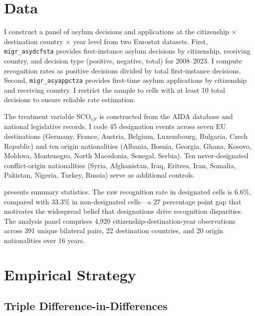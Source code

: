 \documentclass[12pt]{article}
\begin{document}
\section{Data}

I construct a panel of asylum decisions and applications at the citizenship $\times$ destination country $\times$ year level from two Eurostat datasets. First, \texttt{migr\_asydcfsta} provides first-instance asylum decisions by citizenship, receiving country, and decision type (positive, negative, total) for 2008--2023. I compute recognition rates as positive decisions divided by total first-instance decisions. Second, \texttt{migr\_asyappctza} provides first-time asylum applications by citizenship and receiving country. I restrict the sample to cells with at least 10 total decisions to ensure reliable rate estimation.

The treatment variable $\text{SCO}_{cjt}$ is constructed from the AIDA database \citep{aida2023country} and national legislative records. I code 45 designation events across seven EU destinations (Germany, France, Austria, Belgium, Luxembourg, Bulgaria, Czech Republic) and ten origin nationalities (Albania, Bosnia, Georgia, Ghana, Kosovo, Moldova, Montenegro, North Macedonia, Senegal, Serbia). Ten never-designated conflict-origin nationalities (Syria, Afghanistan, Iraq, Eritrea, Iran, Somalia, Pakistan, Nigeria, Turkey, Russia) serve as additional controls.

 presents summary statistics. The raw recognition rate in designated cells is 6.6\%, compared with 33.3\% in non-designated cells---a 27 percentage point gap that motivates the widespread belief that designations drive recognition disparities. The analysis panel comprises 4,920 citizenship-destination-year observations across 391 unique bilateral pairs, 22 destination countries, and 20 origin nationalities over 16 years.



\section{Empirical Strategy}

\subsection{Triple Difference-in-Differences}
\end{document}
